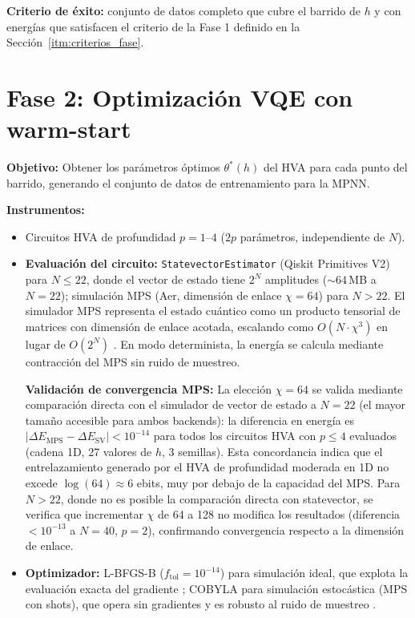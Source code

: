 \documentclass[11pt,a4paper,spanish]{book}
\begin{document}
\textbf{Criterio de éxito:} conjunto de datos completo que cubre el barrido de $h$ y con energías que satisfacen el criterio de la Fase 1 definido en la Sección~\ref{itm:criterios_fase}.

\section{Fase 2: Optimización VQE con warm-start}
\label{sec:fase2}

\textbf{Objetivo:} Obtener los parámetros óptimos $\theta^*(h)$ del HVA para cada punto del barrido, generando el conjunto de datos de entrenamiento para la MPNN.

\textbf{Instrumentos:}
\begin{itemize}
    \item Circuitos HVA de profundidad $p = 1$--$4$ ($2p$ parámetros, independiente de $N$).

    \item \textbf{Evaluación del circuito:} \texttt{StatevectorEstimator} (Qiskit Primitives V2) para $N \leq 22$, donde el vector de estado tiene $2^N$ amplitudes ($\sim 64$\,MB a $N = 22$); simulación MPS (Aer, dimensión de enlace $\chi = 64$) para $N > 22$. El simulador MPS representa el estado cuántico como un producto tensorial de matrices con dimensión de enlace acotada, escalando como $O(N \cdot \chi^3)$ en lugar de $O(2^N)$ \citep{hauschild2018}. En modo determinista, la energía se calcula mediante contracción del MPS sin ruido de muestreo.

    \textbf{Validación de convergencia MPS:} La elección $\chi = 64$ se valida mediante comparación directa con el simulador de vector de estado a $N = 22$ (el mayor tamaño accesible para ambos backends): la diferencia en energía es $|\Delta E_{\text{MPS}} - \Delta E_{\text{SV}}| < 10^{-14}$ para todos los circuitos HVA con $p \leq 4$ evaluados (cadena 1D, 27 valores de $h$, 3 semillas). Esta concordancia indica que el entrelazamiento generado por el HVA de profundidad moderada en 1D no excede $\log(64) \approx 6$ ebits, muy por debajo de la capacidad del MPS. Para $N > 22$, donde no es posible la comparación directa con statevector, se verifica que incrementar $\chi$ de 64 a 128 no modifica los resultados (diferencia $< 10^{-13}$ a $N = 40$, $p = 2$), confirmando convergencia respecto a la dimensión de enlace.

    \item \textbf{Optimizador:} L-BFGS-B ($f_{\text{tol}} = 10^{-14}$) para simulación ideal, que explota la evaluación exacta del gradiente \citep{tilly2022}; COBYLA para simulación estocástica (MPS con shots), que opera sin gradientes y es robusto al ruido de muestreo \citep{singh2025}.


\end{itemize}
\end{document}
